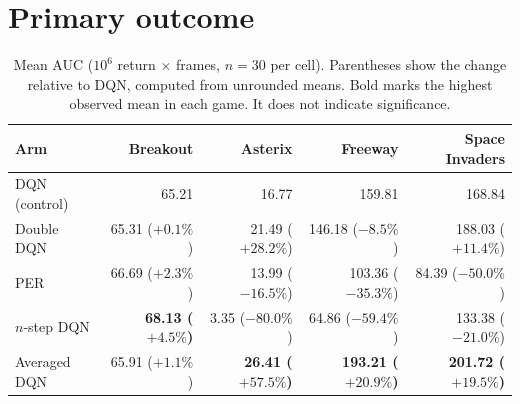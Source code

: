 \documentclass[11pt,a4paper]{article}
\begin{document}
\section*{Primary outcome}
\begin{table}[htbp]
    \centering
    \caption{Mean AUC ($10^6$ return $\times$ frames, $n=30$ per cell).
    Parentheses show the change relative to DQN, computed from unrounded
    means. Bold marks the highest observed mean in each game. It does not
    indicate significance.}
    \label{tab:mean-auc}
    \small
    \begin{tabular}{lrrrr}
        \toprule
        Arm & Breakout & Asterix & Freeway & Space Invaders \\
        \midrule
        DQN (control) & 65.21 & 16.77 & 159.81 & 168.84 \\
        Double DQN & 65.31 ($+0.1\%$) & 21.49 ($+28.2\%$) & 146.18 ($-8.5\%$) & 188.03 ($+11.4\%$) \\
        PER & 66.69 ($+2.3\%$) & 13.99 ($-16.5\%$) & 103.36 ($-35.3\%$) & 84.39 ($-50.0\%$) \\
        $n$-step DQN & \textbf{68.13 ($+4.5\%$)} & 3.35 ($-80.0\%$) & 64.86 ($-59.4\%$) & 133.38 ($-21.0\%$) \\
        Averaged DQN & 65.91 ($+1.1\%$) & \textbf{26.41 ($+57.5\%$)} & \textbf{193.21 ($+20.9\%$)} & \textbf{201.72 ($+19.5\%$)} \\
        \bottomrule
    \end{tabular}
\end{table}
\end{document}
